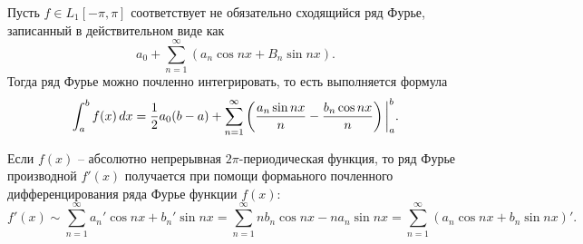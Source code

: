 
\begin{to_thr}
    Пусть $f \in L_1 [-\pi, \pi]$ соответствует не обязательно сходящийся ряд Фурье, записанный в действительном виде как
    \begin{equation*}
        a_0 + \sum_{n=1}^{\infty} (a_n \cos nx + B_n \sin nx).
    \end{equation*}
    Тогда ряд Фурье можно почленно интегрировать, то есть выполняется формула
    \begin{equation*}
        \int_a^b f(x) \, d x =    
        \frac{1}{2} a_0 (b-a) + 
        \sum_{n=1}^{\infty} \left(
            \frac{a_n \sin n x}{n} -
            \frac{b_n \cos nx }{n}
        \right) \bigg|_a^b.
    \end{equation*}
\end{to_thr}



\begin{to_thr}
    Если $f(x)$ -- абсолютно непрерывная $2\pi$-периодическая функция, то ряд Фурье производной $f' (x)$ получается при помощи формаьного почленного дифференцирования ряда Фурье функции $f(x)$:
    \begin{equation*}
        f'(x) \sim \sum_{n=1}^{\infty} a_n' \cos n x + b_n' \sin nx = 
        \sum_{n=1}^{\infty} n b_n \cos n x - n a_n \sin n x = 
        \sum_{n=1}^{\infty} \left(a_n \cos n x + b_n \sin nx\right)'.
    \end{equation*}
\end{to_thr}